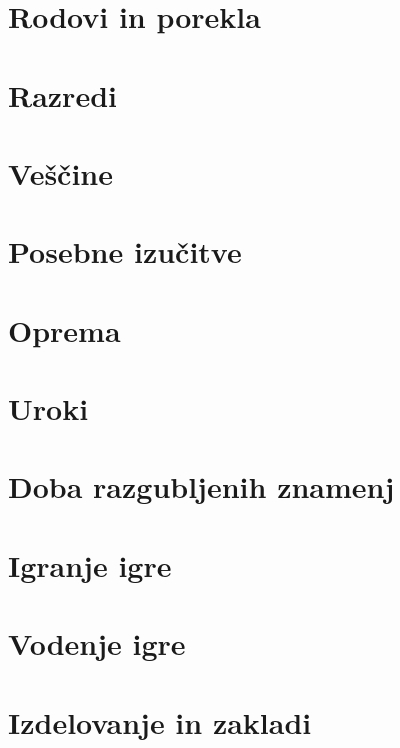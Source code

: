 \documentclass[10pt,a4paper,twocolumn,openany]{book}
\begin{document}
\frontmatter

\rpgMakeCover[
    image = img/cover,
    logo = img/logo,
    title = Stezosledec\\\Huge{Druga izdaja},
    subtitle = Osnovna pravila igre Pathfinder 2e\\Prevedel Grimpy
]



\tableofcontents



\chapter{Rodovi in porekla}

\chapter{Razredi}

\chapter{Veščine}

\chapter{Posebne izučitve}

\chapter{Oprema}

\chapter{Uroki}

\chapter{Doba razgubljenih znamenj}

\chapter{Igranje igre}

\chapter{Vodenje igre}

\chapter{Izdelovanje in zakladi}
\end{document}
